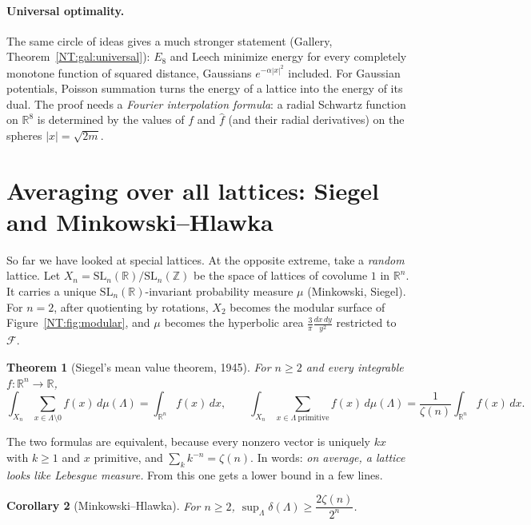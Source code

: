 \documentclass[11pt,openany]{book}
\theoremstyle{plain}
\newtheorem{theorem}{Theorem}[chapter]
\newtheorem{corollary}[theorem]{Corollary}
\theoremstyle{definition}
\theoremstyle{remark}
\newcommand{\R}{\mathbb{R}}
\newcommand{\Z}{\mathbb{Z}}
\newcommand{\Lat}{\Lambda}             %
\newcommand{\SL}{\mathrm{SL}}
\newcommand{\abs}[1]{\left\lvert #1 \right\rvert}
\newcommand{\dens}{\delta}             %
\begin{document}
\paragraph{Universal optimality.} The same circle of ideas gives a much stronger statement (Gallery,
Theorem~\ref{NT:gal:universal}): $E_8$ and Leech minimize energy for every completely monotone function of
squared distance, Gaussians $e^{-\alpha\abs x^2}$ included. For Gaussian potentials, Poisson summation
turns the energy of a lattice into the energy of its dual. The proof needs a \emph{Fourier interpolation
formula}: a radial Schwartz function on $\R^8$ is determined by the values of $f$ and $\hat f$ (and
their radial derivatives) on the spheres $\abs x=\sqrt{2m}$.

\section{Averaging over all lattices: Siegel and Minkowski--Hlawka}
\label{NT:sec:siegel}

So far we have looked at special lattices. At the opposite extreme, take a \emph{random} lattice. Let
$X_n=\SL_n(\R)/\SL_n(\Z)$ be the space of lattices of covolume $1$ in $\R^n$. It carries a unique
$\SL_n(\R)$-invariant probability measure $\mu$ (Minkowski, Siegel). For $n=2$, after quotienting by
rotations, $X_2$ becomes the modular surface of Figure~\ref{NT:fig:modular}, and $\mu$ becomes the
hyperbolic area $\frac{3}{\pi}\frac{dx\,dy}{y^2}$ restricted to $\mathcal F$.

\begin{theorem}[Siegel's mean value theorem, 1945]\label{NT:thm:siegel}
For $n\ge2$ and every integrable $f\colon\R^n\to\R$,
\[
  \int_{X_n}\sum_{x\in\Lat\setminus0}f(x)\,d\mu(\Lat)=\int_{\R^n}f(x)\,dx,
  \qquad
  \int_{X_n}\sum_{x\in\Lat\ \mathrm{primitive}}f(x)\,d\mu(\Lat)=\frac{1}{\zeta(n)}\int_{\R^n}f(x)\,dx .
\]
\end{theorem}

The two formulas are equivalent, because every nonzero vector is uniquely $kx$ with $k\ge1$ and $x$
primitive, and $\sum_kk^{-n}=\zeta(n)$. In words: \emph{on average, a lattice looks like Lebesgue measure.}
From this one gets a lower bound in a few lines.

\begin{corollary}[Minkowski--Hlawka]\label{NT:cor:MH}
For $n\ge2$, $\sup_\Lat\dens(\Lat)\ge\dfrac{2\zeta(n)}{2^n}$.
\end{corollary}
\end{document}

